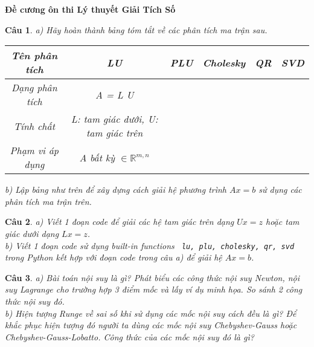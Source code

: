 \documentclass[11pt]{article}
\newtheorem{bt}{Câu}
\begin{document}


\begin{center}
	\textbf{Đề cương ôn thi Lý thuyết Giải Tích Số} 
\end{center}

\begin{bt}\label{lt1}
a) Hãy hoàn thành bảng tóm tắt về các phân tích ma trận sau.
%
\begin{center}
	\begin{tabular}{|c|c|c|c|c|c|}
		\hline
		\rule[-1ex]{0pt}{2.5ex}  Tên phân tích  & LU & PLU & Cholesky & QR & SVD \\
		\hline
		\rule[-1ex]{0pt}{2.5ex}  Dạng phân tích & A = L U &  &  &  &  \\
		\hline
		\rule[-1ex]{0pt}{2.5ex}  Tính chất  & L: tam giác dưới, U: tam giác trên  &  &  &  &  \\
		\hline
		\rule[-1ex]{0pt}{2.5ex}  Phạm vi áp dụng & A bất kỳ $\in \mathbb{R}^{m,n}$  &  &  &  &  \\
		\hline
	\end{tabular}	 
\end{center}
b) Lập bảng như trên để xây dựng cách giải hệ phương trình $Ax = b$ sử dụng các phân tích ma trận trên. \
\end{bt}

\begin{bt}\label{lt1b}
a) Viết 1 đoạn code để giải các hệ tam giác trên dạng $Ux=z$ hoặc tam giác dưới dạng $Lx = z$. \\
b) Viết 1 đoạn code sử dụng built-in functions \verb| lu, plu, cholesky, qr, svd| trong Python kết hợp với đoạn code trong câu a) để giải hệ $Ax=b$.  
\end{bt}

\begin{bt}\label{lt2}
a) Bài toán nội suy là gì? Phát biểu các công thức nội suy Newton, nội suy Lagrange cho trường hợp 3 điểm mốc và lấy ví dụ minh họa. So sánh 2 công thức nội suy đó. \\ 
b) Hiện tượng Runge về sai số khi sử dụng các mốc nội suy cách đều là gì? Để khắc phục hiện tượng đó người ta dùng các mốc nội suy Chebyshev-Gauss hoặc Chebyshev-Gauss-Lobatto. Công thức của các mốc nội suy đó là gì? \\
\end{bt}
\end{document}
